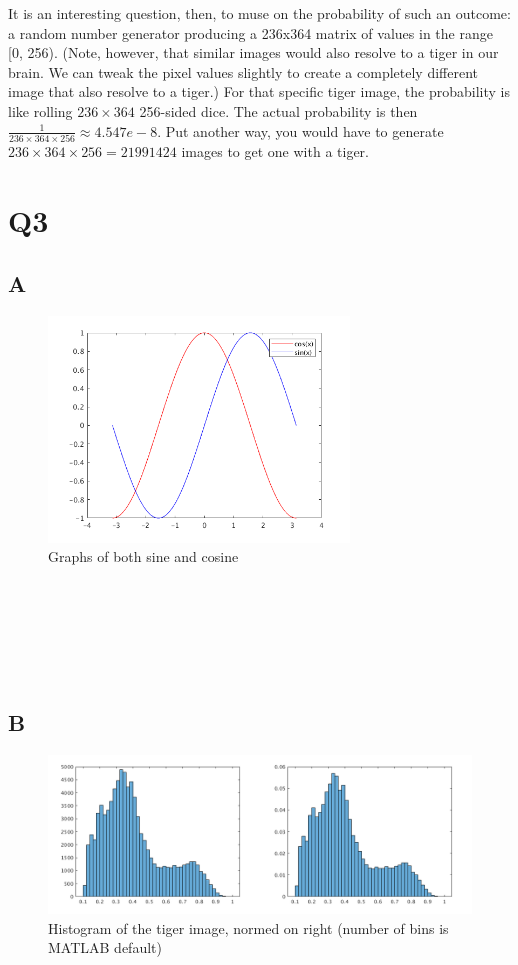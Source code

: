 \documentclass{article}
\begin{document}
It is an interesting question, then, to muse on the probability of such an 
outcome: a random number generator producing a 236x364 matrix of values in the 
range [0, 256). (Note, however, that similar images would also resolve to a 
tiger in our brain. We can tweak the pixel values slightly to create a 
completely different image that also resolve to a tiger.\cite{goodfellow17}) 
For that specific tiger image, the probability is like rolling $236\times 364$ 
256-sided dice. The actual probability is then 
$\frac{1}{236 \times 364 \times 256} \approx 4.547e-8$. Put another way, you 
would have to generate $236 \times 364 \times 256 = 21991424$ images to get one 
with a tiger.

\section{Q3}

\subsection{A}

\begin{figure}[!ht]
	\centering
	\includegraphics[width=80mm]{sin-cos-graph.png}
	\caption{Graphs of both sine and cosine}
\end{figure}

~\\
~\\
~\\
~\\
~\\

\subsection{B}

\begin{figure}[!ht]
	\centering
	\includegraphics[width=160mm]{tiger-hist-combined.png}
	\caption{Histogram of the tiger image, normed on right (number of bins is MATLAB default)}
\end{figure}
\end{document}
